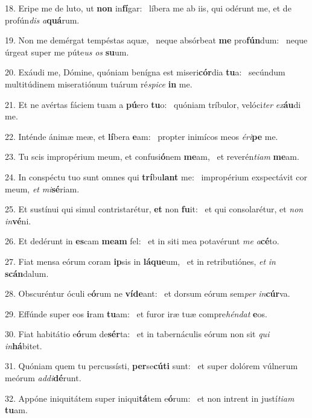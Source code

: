 18. Eripe me de luto, ut \textbf{non} in\textbf{fí}gar: \ast\  líbera me ab iis, qui odérunt me, et de profún\textit{dis} \textit{a}\textbf{quá}rum.\

19. Non me demérgat tempéstas aquæ, \dag\  neque absórbeat \textbf{me} pro\textbf{fún}dum: \ast\  neque úrgeat super me púte\textit{us} \textit{os} \textbf{su}um.\

20. Exáudi me, Dómine, quóniam benígna est miseri\textbf{cór}dia \textbf{tu}a: \ast\  secúndum multitúdinem miseratiónum tuárum ré\textit{spi}\textit{ce} \textbf{in} me.\

21. Et ne avértas fáciem tuam a \textbf{pú}ero \textbf{tu}o: \ast\  quóniam tríbulor, velóci\textit{ter} \textit{ex}\textbf{áu}di me.\

22. Inténde ánimæ meæ, et \textbf{lí}bera \textbf{e}am: \ast\  propter inimícos meos \textit{é}\textit{ri}\textbf{pe} me.\

23. Tu scis impropérium meum, et confusi\textbf{ó}nem \textbf{me}am, \ast\  et reverén\textit{ti}\textit{am} \textbf{me}am.\

24. In conspéctu tuo sunt omnes qui \textbf{trí}bu\textbf{lant} me: \ast\  impropérium exspectávit cor meum, \textit{et} \textit{mi}\textbf{sé}riam.\

25. Et sustínui qui simul contristarétur, \textbf{et} non \textbf{fu}it: \ast\  et qui consolarétur, et \textit{non} \textit{in}\textbf{vé}ni.\

26. Et dedérunt in \textbf{es}cam \textbf{me}\textbf{am} fel: \ast\  et in siti mea potavérunt \textit{me} \textit{a}\textbf{cé}to.\

27. Fiat mensa eórum coram \textbf{ip}sis in \textbf{lá}\textbf{que}um, \ast\  et in retributiónes, \textit{et} \textit{in} \textbf{scán}dalum.\

28. Obscuréntur óculi e\textbf{ó}rum ne \textbf{ví}\textbf{de}ant: \ast\  et dorsum eórum sem\textit{per} \textit{in}\textbf{cúr}va.\

29. Effúnde super eos \textbf{i}ram \textbf{tu}am: \ast\  et furor iræ tuæ compre\textit{hén}\textit{dat} \textbf{e}os.\

30. Fiat habitátio e\textbf{ó}rum de\textbf{sér}ta: \ast\  et in tabernáculis eórum non sit \textit{qui} \textit{in}\textbf{há}bitet.\

31. Quóniam quem tu percussísti, \textbf{per}se\textbf{cú}\textbf{ti} sunt: \ast\  et super dolórem vúlnerum meórum \textit{ad}\textit{di}\textbf{dé}runt.\

32. Appóne iniquitátem super iniqui\textbf{tá}tem e\textbf{ó}rum: \ast\  et non intrent in justí\textit{ti}\textit{am} \textbf{tu}am.\


